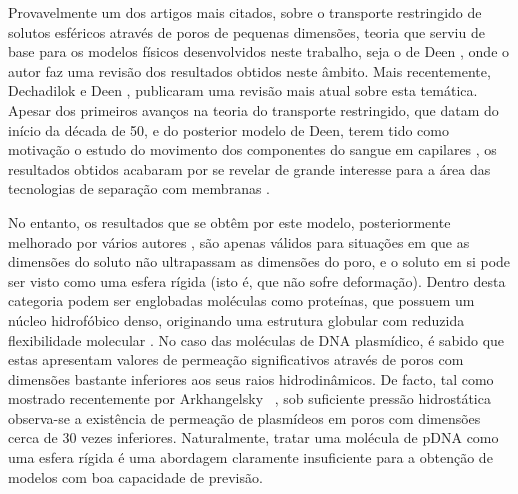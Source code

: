 Provavelmente um dos artigos mais citados, sobre o transporte restringido de solutos esféricos através de poros de pequenas dimensões, teoria que serviu de base para os modelos físicos desenvolvidos neste trabalho, seja o de Deen \cite{deen}, onde o autor faz uma revisão dos resultados obtidos neste âmbito. Mais recentemente, Dechadilok e Deen \cite{dechadilok}, publicaram uma revisão mais atual sobre esta temática. Apesar dos primeiros avanços na teoria do transporte restringido, que datam do início da década de 50, e do posterior modelo de Deen, terem tido como motivação o estudo do movimento dos componentes do sangue em capilares \cite{moraotese}, os resultados obtidos acabaram por se revelar de grande interesse para a área das tecnologias de separação com membranas \cite{moraodes,moraompa,opong,rosa,combe,bowen96,bowen98,mohammad,pinho}. 

No entanto, os resultados que se obtêm por este modelo, posteriormente melhorado por vários autores \cite{dechadilok,moraodes,moraompa,bowen97,bowen02}, são apenas válidos para situações em que as dimensões do soluto não ultrapassam as dimensões do poro, e o soluto em si pode ser visto como uma esfera rígida (isto é, que não sofre deformação). Dentro desta categoria podem ser englobadas moléculas como proteínas, que possuem um núcleo hidrofóbico denso, originando uma estrutura globular com reduzida flexibilidade molecular \cite{latuiecr}. No caso das moléculas de DNA plasmídico, é sabido que estas apresentam valores de permeação significativos através de poros com dimensões bastante inferiores aos seus raios hidrodinâmicos. De facto, tal como mostrado recentemente por Arkhangelsky \et\ \cite{ark11}, sob suficiente pressão hidrostática observa-se a existência de permeação de plasmídeos em poros com dimensões cerca de 30 vezes inferiores. Naturalmente, tratar uma molécula de pDNA como uma esfera rígida é uma abordagem claramente insuficiente para a obtenção de modelos com boa capacidade de previsão. 

